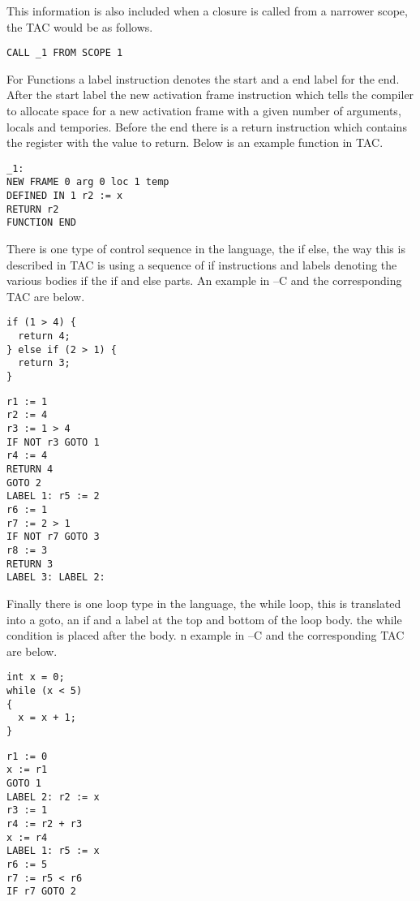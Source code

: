 \documentclass{article}
\begin{document}
This information is also included when a closure is called from a narrower scope,
the TAC would be as follows.

\begin{lstlisting}
CALL _1 FROM SCOPE 1
\end{lstlisting}

For Functions a label instruction denotes the start and a end label for the end.
After the start label the new activation frame instruction which tells
the compiler to allocate space for a new activation frame with a given number
of arguments, locals and tempories. Before the end there is a return instruction
which contains the register with the value to return. Below is an example function
in TAC.

\begin{lstlisting}
_1:
NEW FRAME 0 arg 0 loc 1 temp
DEFINED IN 1 r2 := x
RETURN r2
FUNCTION END
\end{lstlisting}

There is one type of control sequence in the language, the if else, the way this
is described in TAC is using a sequence of if instructions and labels denoting the
various bodies if the if and else parts. An example in --C and the corresponding TAC
are below.

\begin{lstlisting}
if (1 > 4) {
  return 4;
} else if (2 > 1) {
  return 3;
}
\end{lstlisting}

\begin{lstlisting}
r1 := 1
r2 := 4
r3 := 1 > 4
IF NOT r3 GOTO 1
r4 := 4
RETURN 4
GOTO 2
LABEL 1: r5 := 2
r6 := 1
r7 := 2 > 1
IF NOT r7 GOTO 3
r8 := 3
RETURN 3
LABEL 3: LABEL 2:
\end{lstlisting}

Finally there is one loop type in the language, the while loop, this is translated
into a goto, an if and a label at the top and bottom of the loop body. the while
condition is placed after the body. n example in --C and the corresponding TAC
are below.

\begin{lstlisting}
int x = 0;
while (x < 5)
{
  x = x + 1;
}
\end{lstlisting}

\begin{lstlisting}
r1 := 0
x := r1
GOTO 1
LABEL 2: r2 := x
r3 := 1
r4 := r2 + r3
x := r4
LABEL 1: r5 := x
r6 := 5
r7 := r5 < r6
IF r7 GOTO 2
\end{lstlisting}
\end{document}
